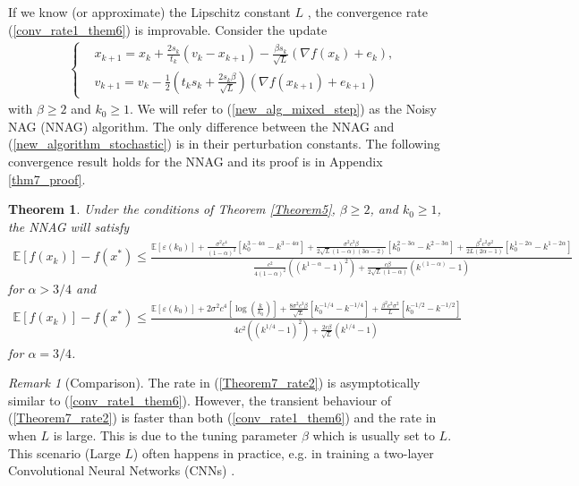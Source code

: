 \documentclass{article}
\theoremstyle{plain}
\newtheorem{theorem}{Theorem}[section]
\theoremstyle{definition}
\theoremstyle{remark}
\newtheorem{remark}{Remark}[theorem]
\begin{document}
If we know (or approximate) the Lipschitz constant $L$ , the convergence rate (\ref{conv_rate1_them6}) is improvable. Consider the update
\begin{align}\label{new_alg_mixed_step}
    \left\{ \begin{array}{ll}
    &x_{k+1}   =    x_{k} + \frac{2s_k}{t_k}(v_k-x_{k+1})-\frac{\beta s_k}{\sqrt{L}}(\nabla f(x_k)+e_k),\\
     &v_{k+1}    = v_k -\tfrac{1}{2}(t_ks_k+\tfrac{2s_k \beta}{\sqrt{L}})(\nabla f(x_{k+1})+e_{k+1})
    \end{array}\right.
\end{align}
with $\beta \geq 2$ and $k_0\geq 1$. We will refer to (\ref{new_alg_mixed_step}) as the Noisy NAG (NNAG) algorithm. The only difference between the NNAG and (\ref{new_algorithm_stochastic}) is in their perturbation constants. The following convergence result holds for the NNAG and its proof is in Appendix \ref{thm7_proof}.
\begin{theorem}\label{Theorem6}
    Under the conditions of Theorem \ref{Theorem5}, $\beta \geq 2$, and $k_0\geq 1$, the NNAG will satisfy 
    \begin{align}
        \mathbb E[f(x_k)]-f(x^*)\leq \tfrac{\mathbb E[\varepsilon(k_0)]+\frac{\sigma^2 c^4}{(1-\alpha)^2} \left[ k_0^{3-4\alpha}-k^{3-4\alpha} \right] + \frac{\sigma^2c^3\beta}{2\sqrt{L}(1-\alpha)(3\alpha -2)}\left[ k_0^{2-3\alpha}-k^{2-3\alpha} \right]+\frac{\beta^2c^2\sigma^2}{2L(2\alpha-1)}\left[ k_0^{1-2\alpha}-k^{1-2\alpha} \right]}{\frac{c^2}{4(1-\alpha)^2}\left((k^{1-\alpha}-1)^2\right)+\frac{c\beta}{2\sqrt{L}(1-\alpha)}\left(k^{(1-\alpha)}-1\right)}\nonumber
    \end{align}
    for $\alpha > 3/4$ and
    \begin{align}\label{Theorem7_rate2}
        \mathbb E[f(x_k)]-f(x^*)\leq \tfrac{\mathbb E[\varepsilon(k_0)]+2\sigma^2 c^4 \left[ \log(\frac{k}{k_0}) \right] + \frac{8\sigma^2c^3\beta}{\sqrt{L}}\left[ k_0^{-1/4}-k^{-1/4} \right]
        +\frac{\beta^2c^2\sigma^2}{L}\left[ k_0^{-1/2}-k^{-1/2} \right]}{4c^2\left((k^{1/4}-1)^2\right)+\frac{2c\beta}{\sqrt{L}}\left(k^{1/4}-1\right)}
    \end{align}
    for $\alpha=3/4$.
\end{theorem}
\begin{remark}[Comparison]
    The rate in (\ref{Theorem7_rate2}) is asymptotically similar to (\ref{conv_rate1_them6}). However, the transient behaviour of (\ref{Theorem7_rate2}) is faster than both (\ref{conv_rate1_them6}) and the rate in \citep{pmlr-v108-laborde20a} when \(L\) is large. This is due to the tuning parameter \(\beta\) which is usually set to \(L\). This scenario (Large \(L\)) often happens in practice, e.g. in training a two-layer Convolutional Neural Networks (CNNs) \citep{shi2022efficiently}. 
\end{remark}
\end{document}
